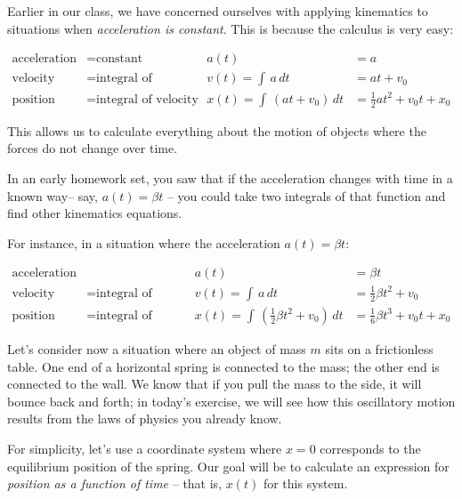 \documentclass[12pt]{article}
\begin{document}
\Large
\centerline{}
\normalsize
\centerline{}

Earlier in our class, we have concerned ourselves with applying kinematics to situations when {\it acceleration is constant}. This is because the calculus is very easy:

\begin{align*}
\text {acceleration} &= \text{constant} &   a(t )&= a \\
\text {velocity} &= \text{integral of acceleration} & v(t) = \int\,a\, dt  &= at + v_0 \\
\text {position} &= \text{integral of velocity} & x(t) = \int\,(at + v_0)\,dt &= \frac{1}{2}at^2 + v_0 t + x_0
\end{align*}

This allows us to calculate everything about the motion of objects where the forces do not change over time.

In an early homework set, you saw that if the acceleration changes with time in a known way-- say, $a(t) = \beta t$ -- you could take two integrals of that function and find other kinematics equations. 


\newpage

For instance, in a situation where the acceleration $a(t) = \beta t$:


\begin{align*}
\text {acceleration} & &    a(t )&= \beta t \\
\text {velocity} &= \text{integral of acceleration} & v(t) = \int\,a\, dt  &= \frac{1}{2}\beta t^2 + v_0 \\
\text {position} &= \text{integral of velocity} & x(t) = \int\,\left(\frac{1}{2}\beta t^2 + v_0\right)\,dt &= \frac{1}{6} \beta t^3 + v_0 t + x_0
\end{align*}
\bigskip

Let's consider now a situation where an object of mass $m$ sits on a frictionless table. One end of a horizontal spring is connected to the mass; the other end is connected to the wall. We know that if you pull the mass to the side, it will bounce back and forth; in today's exercise, we will see how this oscillatory motion results from the laws of physics you already know.

For simplicity, let's use a coordinate system where $x=0$ corresponds to the equilibrium position of the spring. Our goal will be to calculate an expression for {\it position as a function of time} -- that is, $x(t)$ for this system.
\end{document}

